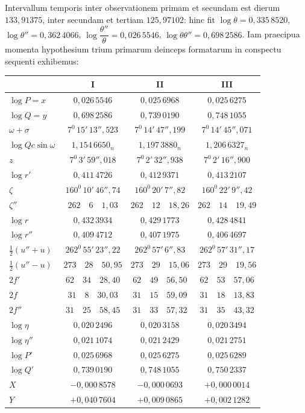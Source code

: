 Intervallum temporis inter observationem primam et secundam est dierum
$133{,}91375$, inter secundam et tertiam $125{,}97102$: hinc fit $\log\theta = 0{,}335\,8520$,
$\log\theta'' = 0{,}362\,4066$, $\log\dfrac{\theta''}{\theta} = 0{,}026\,5546$, $\log\theta\theta'' = 0{,}698\,2586$. Iam praecipua
momenta hypothesium trium primarum deinceps formatarum in conspectu sequenti exhibemus:
\begin{center}\begingroup\footnotesize\setlength{\tabcolsep}{3pt}\renewcommand{\arraystretch}{1.3}
\begin{tabular}{l|c|c|c}
 & I & II & III \\
\hline
$\log P = x$ & $0{,}026\,5546$ & $0{,}025\,6968$ & $0{,}025\,6275$ \\
$\log Q = y$ & $0{,}698\,2586$ & $0{,}739\,0190$ & $0{,}748\,1055$ \\
$\omega + \sigma$ & $7^0\,15'\,13''{,}523$ & $7^0\,14'\,47''{,}199$ & $7^0\,14'\,45''{,}071$ \\
$\log Qc\sin\omega$ & $1{,}154\,6650_n$ & $1{,}197\,3880_n$ & $1{,}206\,6327_n$ \\
$z$ & $7^0\,3'\,59''{,}018$ & $7^0\,2'\,32''{,}938$ & $7^0\,2'\,16''{,}900$ \\
$\log r'$ & $0{,}411\,4726$ & $0{,}412\,9371$ & $0{,}413\,2107$ \\
$\zeta$ & $160^0\,10'\,46''{,}74$ & $160^0\,20'\,7''{,}82$ & $160^0\,22'\,9''{,}42$ \\
$\zeta''$ & $262\quad6\quad1{,}03$ & $262\quad12\quad18{,}26$ & $262\quad14\quad19{,}49$ \\
$\log r$ & $0{,}432\,3934$ & $0{,}429\,1773$ & $0{,}428\,4841$ \\
$\log r''$ & $0{,}409\,4712$ & $0{,}407\,1975$ & $0{,}406\,4697$ \\
$\tfrac12(u''+u)$ & $262^0\,55'\,23''{,}22$ & $262^0\,57'\,6''{,}83$ & $262^0\,57'\,31''{,}17$ \\
$\tfrac12(u''-u)$ & $273\quad28\quad50{,}95$ & $273\quad29\quad15{,}06$ & $273\quad29\quad19{,}56$ \\
$2f'$ & $62\quad34\quad28{,}40$ & $62\quad49\quad56{,}50$ & $62\quad53\quad57{,}06$ \\
$2f$ & $31\quad8\quad30{,}03$ & $31\quad15\quad59{,}09$ & $31\quad18\quad13{,}83$ \\
$2f''$ & $31\quad25\quad58{,}45$ & $31\quad33\quad57{,}32$ & $31\quad35\quad43{,}32$ \\
$\log \eta$ & $0{,}020\,2496$ & $0{,}020\,3158$ & $0{,}020\,3494$ \\
$\log \eta''$ & $0{,}021\,1074$ & $0{,}021\,2429$ & $0{,}021\,2751$ \\
$\log P'$ & $0{,}025\,6968$ & $0{,}025\,6275$ & $0{,}025\,6289$ \\
$\log Q'$ & $0{,}739\,0190$ & $0{,}748\,1055$ & $0{,}750\,2337$ \\
$X$ & $-0{,}000\,8578$ & $-0{,}000\,0693$ & $+0{,}000\,0014$ \\
$Y$ & $+0{,}040\,7604$ & $+0{,}009\,0865$ & $+0{,}002\,1282$ \\
\end{tabular}
\endgroup\end{center}

